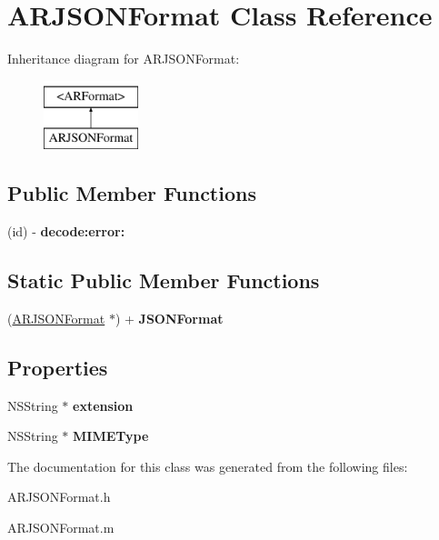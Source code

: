 \hypertarget{a00004}{
\section{\-A\-R\-J\-S\-O\-N\-Format \-Class \-Reference}
\label{a00004}
}
\-Inheritance diagram for \-A\-R\-J\-S\-O\-N\-Format\-:\begin{figure}[H]
\begin{center}
\leavevmode
\includegraphics[height=2.000000cm]{a00004}
\end{center}
\end{figure}
\subsection*{\-Public \-Member \-Functions}
\begin{DoxyCompactItemize}
\item 
\hypertarget{a00004_a159f58fb068d2e7f1ffe77b735e8c2e1}{
(id) -\/ {\bfseries decode\-:error\-:}}
\label{a00004_a159f58fb068d2e7f1ffe77b735e8c2e1}

\end{DoxyCompactItemize}
\subsection*{\-Static \-Public \-Member \-Functions}
\begin{DoxyCompactItemize}
\item 
\hypertarget{a00004_a7bf04c4f354e58320612a65b2973207a}{
(\hyperlink{a00004}{\-A\-R\-J\-S\-O\-N\-Format} $\ast$) + {\bfseries \-J\-S\-O\-N\-Format}}
\label{a00004_a7bf04c4f354e58320612a65b2973207a}

\end{DoxyCompactItemize}
\subsection*{\-Properties}
\begin{DoxyCompactItemize}
\item 
\hypertarget{a00004_ad7ea03657677e9b4d7042ec8d104f0d7}{
\-N\-S\-String $\ast$ {\bfseries extension}}
\label{a00004_ad7ea03657677e9b4d7042ec8d104f0d7}

\item 
\hypertarget{a00004_a7d60cc0897ce7f472ae796f7c3ea6bc1}{
\-N\-S\-String $\ast$ {\bfseries \-M\-I\-M\-E\-Type}}
\label{a00004_a7d60cc0897ce7f472ae796f7c3ea6bc1}

\end{DoxyCompactItemize}


\-The documentation for this class was generated from the following files\-:\begin{DoxyCompactItemize}
\item 
\-A\-R\-J\-S\-O\-N\-Format.\-h\item 
\-A\-R\-J\-S\-O\-N\-Format.\-m\end{DoxyCompactItemize}
